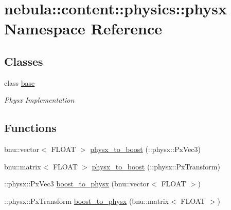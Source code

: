 \hypertarget{namespacenebula_1_1content_1_1physics_1_1physx}{
\section{nebula::content::physics::physx Namespace Reference}
\label{namespacenebula_1_1content_1_1physics_1_1physx}
}
\subsection*{Classes}
\begin{DoxyCompactItemize}
\item 
class \hyperlink{classnebula_1_1content_1_1physics_1_1physx_1_1base}{base}
\begin{DoxyCompactList}\small\item\em Physx Implementation \item\end{DoxyCompactList}\end{DoxyCompactItemize}
\subsection*{Functions}
\begin{DoxyCompactItemize}
\item 
bnu::vector$<$ FLOAT $>$ \hyperlink{namespacenebula_1_1content_1_1physics_1_1physx_a421b2b028e6b960a77656f531c6e2e99}{physx\_\-to\_\-boost} (::physx::PxVec3)
\item 
bnu::matrix$<$ FLOAT $>$ \hyperlink{namespacenebula_1_1content_1_1physics_1_1physx_a83251ccfbe82a792dfe564636bf3028c}{physx\_\-to\_\-boost} (::physx::PxTransform)
\item 
::physx::PxVec3 \hyperlink{namespacenebula_1_1content_1_1physics_1_1physx_afc6ea9f045e8811b84467045f45adf73}{boost\_\-to\_\-physx} (bnu::vector$<$ FLOAT $>$)
\item 
::physx::PxTransform \hyperlink{namespacenebula_1_1content_1_1physics_1_1physx_a42899bfaa002c3e69981d26813d3d0a2}{boost\_\-to\_\-physx} (bnu::matrix$<$ FLOAT $>$)
\end{DoxyCompactItemize}



